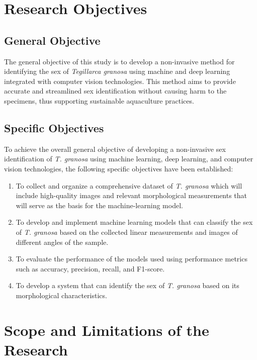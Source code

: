 \section{Research Objectives}
\label{sec:researchobjectives}

\subsection{General Objective}
\label{sec:generalobjective}

The general objective of this study is to develop a non-invasive method for identifying the sex of \textit{Tegillarca granosa} using machine and deep learning integrated with computer vision technologies. This method aims to provide accurate and streamlined sex identification without causing harm to the specimens, thus supporting sustainable aquaculture practices.

\subsection{Specific Objectives}
\label{sec:specificobjectives}

To achieve the overall general objective of developing a non-invasive sex identification of \textit{T. granosa} using machine learning, deep learning, and computer vision technologies, the following specific objectives have been established:  

\begin{enumerate}
   \item To collect and organize a comprehensive dataset of \textit{T. granosa} which will include high-quality images and relevant morphological measurements that will serve as the basis for the machine-learning model.
 
   \item To develop and implement machine learning models that can classify the sex of \textit{T. granosa} based on the collected linear measurements and images of different angles of the sample.
   
   \item To evaluate the performance of the models used using performance metrics such as accuracy, precision, recall, and F1-score. 
   
   \item To develop a system that can identify the sex of \textit{T. granosa} based on its morphological characteristics. 
\end{enumerate}

\section{Scope and Limitations of the Research}
\label{sec:scopelimitations}

